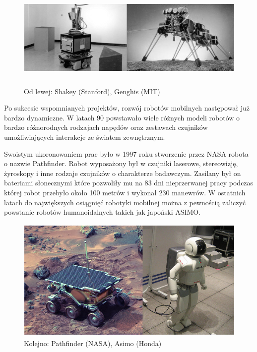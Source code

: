 \begin{figure}[hb]
 \centering
 \includegraphics[height=50mm]{../images/ch01/shakey_and_genghis.png}
 \caption{Od lewej: Shakey (Stanford), Genghis (MIT) }
 \label{fig:RobotsHistory_Shakey_Genghis}
\end{figure}

Po sukcesie wspomnianych projektów, rozwój robotów mobilnych następował już
bardzo dynamiczne. W latach 90 powstawało wiele różnych modeli robotów o bardzo
różnorodnych rodzajach napędów oraz zestawach czujników umożliwiających
interakcje ze światem zewnętrznym.

\newpage
Swoistym ukoronowaniem prac było w 1997 roku stworzenie przez NASA robota o
nazwie Pathfinder. Robot wyposażony był w czujniki laserowe, stereowizję,
żyroskopy i inne rodzaje czujników o charakterze badawczym. Zasilany był on
bateriami słonecznymi które pozwoliły mu na 83 dni nieprzerwanej pracy podczas
której robot przebyło około 100 metrów i wykonał 230 manewrów. W ostatnich
latach do największych osiągnięć robotyki mobilnej można z pewnością zaliczyć
powstanie robotów humanoidalnych takich jak japoński ASIMO. 

\begin{figure}[hb]
 \centering
 \includegraphics[height=60mm]{../images/ch01/pathfinder_and_asimo.png}
 \caption{Kolejno: Pathfinder (NASA), Asimo (Honda)}
 \label{fig:RobotsHistory_Pathfinder_Asimo}
\end{figure}

